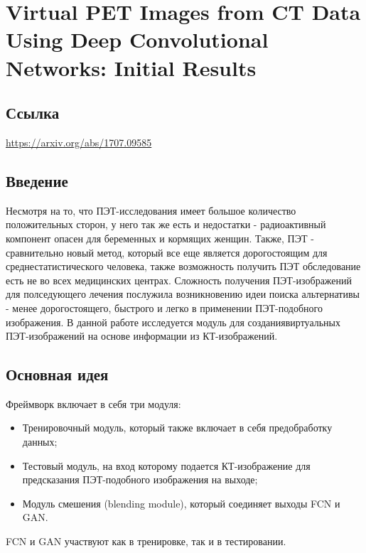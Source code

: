 \section{Virtual PET Images from CT Data Using Deep
Convolutional Networks: Initial Results}

\subsection*{Ссылка}\url{https://arxiv.org/abs/1707.09585}
\subsection*{Введение}
Несмотря на то, что ПЭТ-исследования имеет большое количество положительных 
сторон, у него так же есть и недостатки - радиоактивный компонент опасен 
для беременных и кормящих женщин. Также, ПЭТ - сравнительно новый метод, который все 
еще является дорогостоящим для среднестатистического человека, также возможность получить 
ПЭТ обследование есть не во всех медицинских центрах. Сложность получения ПЭТ-изображений для 
полседующего лечения послужила возникновению идеи поиска альтернативы - менее дорогостоящего, быстрого 
и легко в применении ПЭТ-подобного изображения. В данной работе исследуется 
модуль для созданиявиртуальных ПЭТ-изображений на основе информации из КТ-изображений.
\subsection*{Основная идея}
Фреймворк включает в себя три модуля:
\begin{itemize}
    \item Тренировочный модуль, который также включает в себя предобработку данных;
    \item Тестовый модуль, на вход которому подается КТ-изображение для предсказания 
    ПЭТ-подобного изображения на выходе;
    \item Модуль смешения (blending module), который соединяет выходы FCN и GAN.
\end{itemize}
FCN и GAN участвуют как в тренировке, так и в тестировании.

